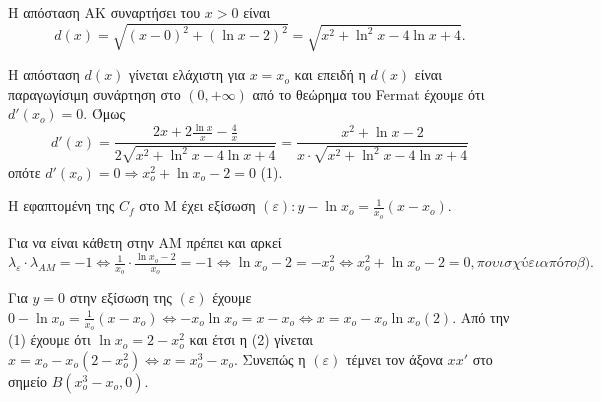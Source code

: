\begin{figure}
\end{figure}
\begin{alist}
\item [α.] Η απόσταση ΑΚ συναρτήσει του $x > 0$ είναι
    \[ d(x) = \sqrt{(x-0)^2 + (\ln x - 2)^2} = \sqrt{x^2 + \ln^2 x - 4\ln x + 4} . \]
\item [β.] Η απόσταση $d(x)$ γίνεται ελάχιστη για $x=x_o$ και επειδή η $d(x)$ είναι παραγωγίσιμη συνάρτηση στο $(0,+\infty)$ από το θεώρημα του Fermat έχουμε ότι $d'(x_o)=0$. Όμως
    \[ d'(x) = \frac{2x + 2 \frac{\ln x}{x} - \frac{4}{x}}{2\sqrt{x^2 + \ln^2 x - 4\ln x + 4}} = \frac{x^2 + \ln x - 2}{x \cdot \sqrt{x^2 + \ln^2 x - 4\ln x + 4}} \]
    οπότε $d'(x_o)=0 \Rightarrow x_o^2 + \ln x_o - 2 = 0$ (1).
\item [γ.] Η εφαπτομένη της $C_f$ στο Μ έχει εξίσωση $(\varepsilon) : y - \ln x_o = \frac{1}{x_o}(x-x_o)$.
\begin{rlist}
\item [i.] Για να είναι κάθετη στην AM πρέπει και αρκεί
    $\lambda_{\varepsilon} \cdot \lambda_{AM} = -1 \Leftrightarrow \frac{1}{x_o} \cdot \frac{\ln x_o - 2}{x_o} = -1 \Leftrightarrow \ln x_o - 2 = -x_o^2 \Leftrightarrow x_o^2 + \ln x_o - 2 = 0 , που ισχύει από το β).$
\item [ii.] Για $y=0$ στην εξίσωση της $(\varepsilon)$ έχουμε
    $0 - \ln x_o = \frac{1}{x_o}(x-x_o) \Leftrightarrow -x_o \ln x_o = x-x_o \Leftrightarrow x = x_o - x_o \ln x_o (2).$
    Από την (1) έχουμε ότι $\ln x_o = 2 - x_o^2$ και έτσι η (2) γίνεται $x = x_o - x_o(2-x_o^2) \Leftrightarrow x = x_o^3 - x_o$. Συνεπώς η $(\varepsilon)$ τέμνει τον άξονα $xx'$ στο σημείο $B(x_o^3 - x_o, 0)$.
\end{rlist}
\end{alist}